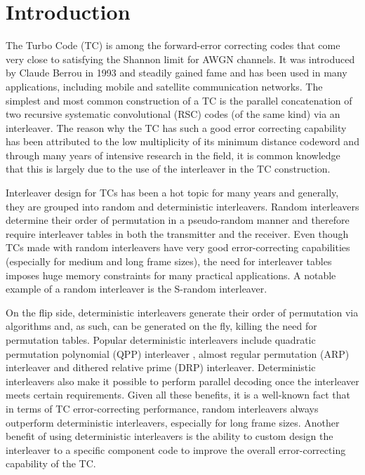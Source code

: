 \section{Introduction}
The Turbo Code (TC) \cite{ref1} is among the forward-error correcting codes that come very close to satisfying the Shannon limit for AWGN channels. It was introduced by Claude Berrou in 1993 and steadily gained fame and has been used in many applications, 
including mobile and satellite communication networks. The simplest and most common construction of a TC is the parallel concatenation of two recursive systematic convolutional (RSC) codes (of the same kind) via an interleaver. The reason why the TC has such a good error correcting capability has been attributed to the low multiplicity of its minimum distance codeword and through many years of intensive research in the field, it is common knowledge that this is largely due to the use of the interleaver in the TC construction.

Interleaver design for TCs has been a hot topic for many years and generally, they are grouped into random and deterministic interleavers. Random interleavers determine their order of permutation in a pseudo-random manner and therefore require interleaver tables in both the transmitter and the receiver. Even though TCs made with random interleavers have very good error-correcting capabilities (especially for medium and long frame sizes), the need for interleaver tables imposes huge memory constraints for many practical applications. A notable example of a random interleaver is the S-random interleaver.

On the flip side, deterministic interleavers generate their order of 
permutation via \newline algorithms and, as such, can be generated on the fly, killing the need for permutation tables. Popular deterministic interleavers include quadratic permutation polynomial (QPP) interleaver \cite{ref5}, almost regular permutation (ARP) interleaver and dithered relative prime (DRP) interleaver. Deterministic interleavers also make it possible to perform parallel decoding once the interleaver meets certain requirements. Given all these benefits, it is a well-known fact that in terms of TC error-correcting performance, random interleavers always outperform deterministic interleavers, especially for long frame sizes.
Another benefit of using deterministic interleavers is the ability to custom design the interleaver to a specific component code to improve the overall error-correcting capability of the TC. 

